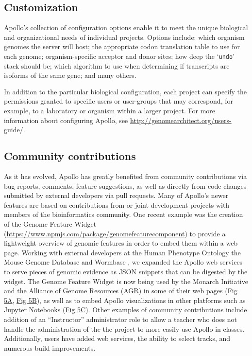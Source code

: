 \subsection*{Customization}

Apollo's collection of configuration options enable it to meet the
unique biological and organizational needs of individual projects.
Options include: which organism genomes the server will host; the
appropriate codon translation table to use for each genome;
organism-specific acceptor and donor sites; how deep the `\texttt{undo}'
stack should be; which algorithm to use when determining if transcripts
are isoforms of the same gene; and many others.

In addition to the particular biological configuration, each project can
specify the permissions granted to specific users or user-groups that
may correspond, for example, to a laboratory or organism within a larger
project. For more information about configuring Apollo, see
\url{http://genomearchitect.org/users-guide/}.

\subsection*{Community contributions}

As it has evolved, Apollo has greatly benefited from community
contributions via bug reports, comments, feature suggestions, as well as
directly from code changes submitted by external developers via pull
requests. Many of Apollo's newer features are based on contributions
from or joint development projects with members of the bioinformatics
community. One recent example was the creation of the Genome Feature
Widget (\url{https://www.npmjs.com/package/genomefeaturecomponent}) to
provide a lightweight overview of genomic features in order to embed
them within a web page. Working with external developers at the Human
Phenotype Ontology \cite{K_hler_2016} the Mouse Genome Database \cite{Smith_2017} and
Wormbase \cite{Lee_2017}, we expanded the Apollo web services to serve pieces
of genomic evidence as JSON snippets that can be digested by the widget.
The Genome Feature Widget is now being used by the Monarch Initiative
\cite{McMurry_2016} and the Alliance of Genome Resources (AGR) \cite{AllianceGenomeResources} in some of
their web pages (\protect\hyperlink{pcbi.1006790.g005}{Fig 5A},
\protect\hyperlink{pcbi.1006790.g005}{Fig 5B}), as well as to embed
Apollo visualizations in other platforms such as Jupyter Notebooks
(\protect\hyperlink{pcbi.1006790.g005}{Fig 5C}). Other examples of
community contributions include addition of an ``Instructor''
administrator role to allow a teacher who does not handle the
administration of the the project to more easily use Apollo in classes.
Additionally, users have added web services, the ability to select
tracks, and numerous build improvements.


